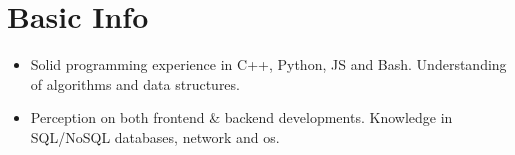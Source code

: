 \documentclass{resume}
\begin{document}





\section{Basic Info}
\begin{itemize}
    \item Solid programming experience in C++, Python, JS and Bash. Understanding of algorithms and data structures.
    \item Perception on both frontend \& backend developments. Knowledge in SQL/NoSQL databases, network and os. 
\end{itemize}
\end{document}
